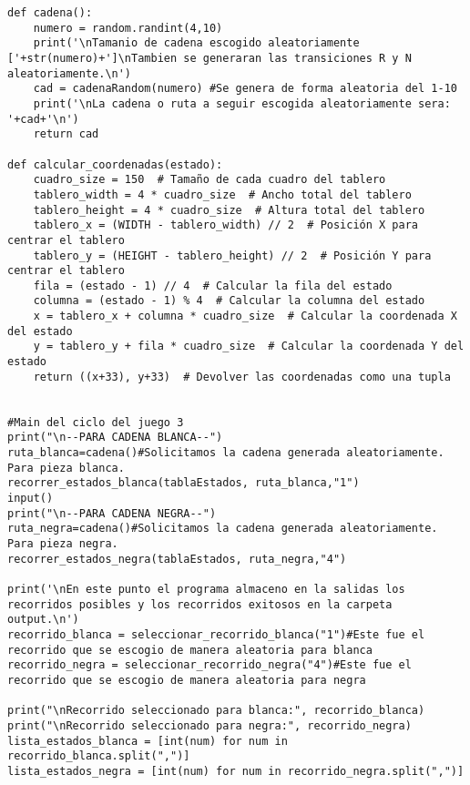 \begin{lstlisting}
def cadena():
    numero = random.randint(4,10)
    print('\nTamanio de cadena escogido aleatoriamente ['+str(numero)+']\nTambien se generaran las transiciones R y N aleatoriamente.\n')
    cad = cadenaRandom(numero) #Se genera de forma aleatoria del 1-10
    print('\nLa cadena o ruta a seguir escogida aleatoriamente sera: '+cad+'\n')
    return cad

def calcular_coordenadas(estado):
    cuadro_size = 150  # Tamaño de cada cuadro del tablero
    tablero_width = 4 * cuadro_size  # Ancho total del tablero
    tablero_height = 4 * cuadro_size  # Altura total del tablero
    tablero_x = (WIDTH - tablero_width) // 2  # Posición X para centrar el tablero
    tablero_y = (HEIGHT - tablero_height) // 2  # Posición Y para centrar el tablero
    fila = (estado - 1) // 4  # Calcular la fila del estado
    columna = (estado - 1) % 4  # Calcular la columna del estado
    x = tablero_x + columna * cuadro_size  # Calcular la coordenada X del estado
    y = tablero_y + fila * cuadro_size  # Calcular la coordenada Y del estado
    return ((x+33), y+33)  # Devolver las coordenadas como una tupla


#Main del ciclo del juego 3
print("\n--PARA CADENA BLANCA--")
ruta_blanca=cadena()#Solicitamos la cadena generada aleatoriamente. Para pieza blanca.
recorrer_estados_blanca(tablaEstados, ruta_blanca,"1")
input()
print("\n--PARA CADENA NEGRA--")
ruta_negra=cadena()#Solicitamos la cadena generada aleatoriamente. Para pieza negra.
recorrer_estados_negra(tablaEstados, ruta_negra,"4")

print('\nEn este punto el programa almaceno en la salidas los recorridos posibles y los recorridos exitosos en la carpeta output.\n')
recorrido_blanca = seleccionar_recorrido_blanca("1")#Este fue el recorrido que se escogio de manera aleatoria para blanca
recorrido_negra = seleccionar_recorrido_negra("4")#Este fue el recorrido que se escogio de manera aleatoria para negra

print("\nRecorrido seleccionado para blanca:", recorrido_blanca)
print("\nRecorrido seleccionado para negra:", recorrido_negra)
lista_estados_blanca = [int(num) for num in recorrido_blanca.split(",")]
lista_estados_negra = [int(num) for num in recorrido_negra.split(",")]


\end{lstlisting}
